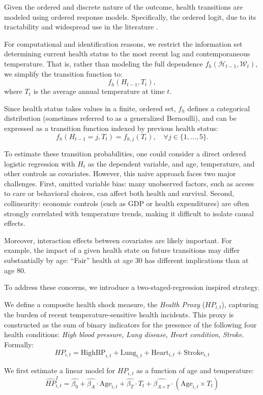 \documentclass{article}
\begin{document}
Given the ordered and discrete nature of the outcome, health transitions are modeled using ordered response models. 
Specifically, the ordered logit, due to its tractability and widespread use in the literature \cite{Wooldridge_2010}.

For computational and identification reasons, we restrict the information set determining current health status to the most recent lag and contemporaneous temperature. That is, rather than modeling the full dependence $f_h(\mathcal{H}_{t-1}, \mathcal{W}_{t})$, we simplify the transition function to:
\[
f_{h}(H_{t-1}, T_{t}),
\]
where $T_t$ is the average annual temperature at time $t$.

Since health status takes values in a finite, ordered set, $f_h$ defines a categorical distribution (sometimes referred to as a generalized Bernoulli), and can be expressed as a transition function indexed by previous health status:
\[
f_{h}(H_{t-1} = j, T_{t}) = f_{h,j}(T_{t}), \quad \forall j \in \{1,\dots,5\}.
\]

To estimate these transition probabilities, one could consider a direct ordered logistic regression with $H_t$ as the dependent variable, and age, temperature, and other controls as covariates. However, this naive approach faces two major challenges. First, omitted variable bias: many unobserved factors, such as access to care or behavioral choices, can affect both health and survival. Second, collinearity: economic controls (such as GDP or health expenditures) are often strongly correlated with temperature trends, making it difficult to isolate causal effects.

Moreover, interaction effects between covariates are likely important.
For example, the impact of a given health state on future transitions may differ substantially by age: 
“Fair” health at age 30 has different implications than at age 80.

To address these concerns, we introduce a two-staged-regression inspired strategy.

We define a composite health shock measure, the \textit{Health Proxy} ($HP_{i,t}$), capturing the burden of recent temperature-sensitive health incidents.
This proxy is constructed as the sum of binary indicators for the presence of the following four health conditions:
\textit{High blood pressure},
\textit{Lung disease},
\textit{Heart condition},
\textit{Stroke}.
Formally:
\[
HP_{i,t} = \text{HighBP}_{i,t} + \text{Lung}_{i,t} + \text{Heart}_{i,t} + \text{Stroke}_{i,t}
\]

We first estimate a linear model for $HP_{i,t}$ as a function of age and temperature:
\[
\widehat{HP}_{i,t}^{I} = \widehat{\beta_0} + \widehat{\beta_A} \cdot \text{Age}_{i,t} + \widehat{\beta_T} \cdot T_t + \widehat{\beta_{A \times T}} \cdot (\text{Age}_{i,t} \times T_t)
\]
\end{document}
